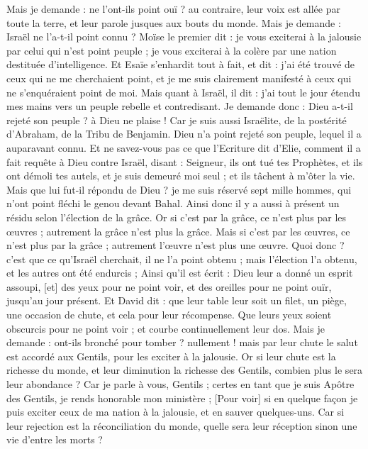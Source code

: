 \begin{multicols}{2}
Mais je demande : ne l'ont-ils point ouï ? au contraire, leur voix est allée par toute la terre, et leur parole jusques aux bouts du monde.
Mais je demande : Israël ne l'a-t-il point connu ? Moïse le premier dit : je vous exciterai à la jalousie par celui qui n'est point peuple ; je vous exciterai à la colère par une nation destituée d'intelligence.
Et Esaïe s'enhardit tout à fait, et dit : j'ai été trouvé de ceux qui ne me cherchaient point, et je me suis clairement manifesté à ceux qui ne s'enquéraient point de moi.
Mais quant à Israël, il dit : j'ai tout le jour étendu mes mains vers un peuple rebelle et contredisant.
\VerseOne{}Je demande donc : Dieu a-t-il rejeté son peuple ? à Dieu ne plaise ! Car je suis aussi Israëlite, de la postérité d'Abraham, de la Tribu de Benjamin.
Dieu n'a point rejeté son peuple, lequel il a auparavant connu. Et ne savez-vous pas ce que l'Ecriture dit d'Elie, comment il a fait requête à Dieu contre Israël, disant :
Seigneur, ils ont tué tes Prophètes, et ils ont démoli tes autels, et je suis demeuré moi seul ; et ils tâchent à m'ôter la vie.
Mais que lui fut-il répondu de Dieu ? je me suis réservé sept mille hommes, qui n'ont point fléchi le genou devant Bahal.
Ainsi donc il y a aussi à présent un résidu selon l'élection de la grâce.
Or si c'est par la grâce, ce n'est plus par les œuvres ; autrement la grâce n'est plus la grâce. Mais si c'est par les œuvres, ce n'est plus par la grâce ; autrement l'œuvre n'est plus une œuvre.
Quoi donc ? c'est que ce qu'Israël cherchait, il ne l'a point obtenu ; mais l'élection l'a obtenu, et les autres ont été endurcis ;
Ainsi qu'il est écrit : Dieu leur a donné un esprit assoupi, [et] des yeux pour ne point voir, et des oreilles pour ne point ouïr, jusqu'au jour présent.
Et David dit : que leur table leur soit un filet, un piège, une occasion de chute, et cela pour leur récompense.
Que leurs yeux soient obscurcis pour ne point voir ; et courbe continuellement leur dos.
Mais je demande : ont-ils bronché pour tomber ? nullement ! mais par leur chute le salut est accordé aux Gentils, pour les exciter à la jalousie.
Or si leur chute est la richesse du monde, et leur diminution la richesse des Gentils, combien plus le sera leur abondance ?
Car je parle à vous, Gentils ; certes en tant que je suis Apôtre des Gentils, je rends honorable mon ministère ;
[Pour voir] si en quelque façon je puis exciter ceux de ma nation à la jalousie, et en sauver quelques-uns.
Car si leur rejection est la réconciliation du monde, quelle sera leur réception sinon une vie d'entre les morts ?

\end{multicols}
